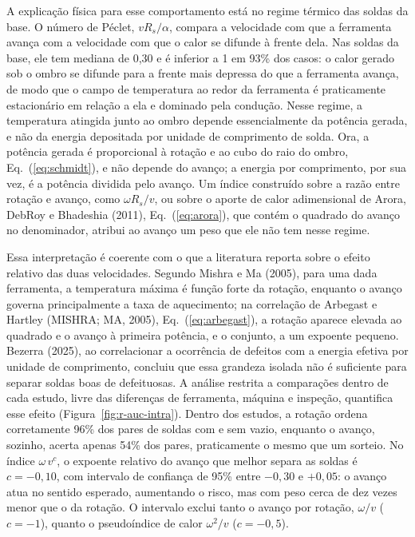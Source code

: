 \documentclass[12pt,openany]{report}
\begin{document}
A explicação física para esse comportamento está no regime térmico das soldas da base. O número de Péclet, $vR_s/\alpha$, compara a velocidade com que a ferramenta avança com a velocidade com que o calor se difunde à frente dela. Nas soldas da base, ele tem mediana de 0,30 e é inferior a 1 em 93\% dos casos: o calor gerado sob o ombro se difunde para a frente mais depressa do que a ferramenta avança, de modo que o campo de temperatura ao redor da ferramenta é praticamente estacionário em relação a ela e dominado pela condução. Nesse regime, a temperatura atingida junto ao ombro depende essencialmente da potência gerada, e não da energia depositada por unidade de comprimento de solda. Ora, a potência gerada é proporcional à rotação e ao cubo do raio do ombro, Eq.~(\ref{eq:schmidt}), e não depende do avanço; a energia por comprimento, por sua vez, é a potência dividida pelo avanço. Um índice construído sobre a razão entre rotação e avanço, como $\omega R_s/v$, ou sobre o aporte de calor adimensional de Arora, DebRoy e Bhadeshia (2011), Eq.~(\ref{eq:arora}), que contém o quadrado do avanço no denominador, atribui ao avanço um peso que ele não tem nesse regime.

Essa interpretação é coerente com o que a literatura reporta sobre o efeito relativo das duas velocidades. Segundo Mishra e Ma (2005), para uma dada ferramenta, a temperatura máxima é função forte da rotação, enquanto o avanço governa principalmente a taxa de aquecimento; na correlação de Arbegast e Hartley (MISHRA; MA, 2005), Eq.~(\ref{eq:arbegast}), a rotação aparece elevada ao quadrado e o avanço à primeira potência, e o conjunto, a um expoente pequeno. Bezerra (2025), ao correlacionar a ocorrência de defeitos com a energia efetiva por unidade de comprimento, concluiu que essa grandeza isolada não é suficiente para separar soldas boas de defeituosas. A análise restrita a comparações dentro de cada estudo, livre das diferenças de ferramenta, máquina e inspeção, quantifica esse efeito (Figura~\ref{fig:r-auc-intra}). Dentro dos estudos, a rotação ordena corretamente 96\% dos pares de soldas com e sem vazio, enquanto o avanço, sozinho, acerta apenas 54\% dos pares, praticamente o mesmo que um sorteio. No índice $\omega\,v^{c}$, o expoente relativo do avanço que melhor separa as soldas é $c = -0{,}10$, com intervalo de confiança de 95\% entre $-0{,}30$ e $+0{,}05$: o avanço atua no sentido esperado, aumentando o risco, mas com peso cerca de dez vezes menor que o da rotação. O intervalo exclui tanto o avanço por rotação, $\omega/v$ ($c = -1$), quanto o pseudoíndice de calor $\omega^{2}/v$ ($c = -0{,}5$).
\end{document}
